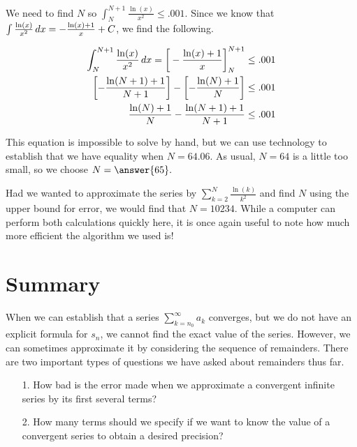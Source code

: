 \documentclass{ximera}
\begin{document}
\begin{example}
\begin{example}
\begin{explanation}
We need to find $N$ so $\int_{N}^{N+1} \frac{\ln(x)}{x^2} \leq .001$.  Since we know that $\int  \frac{\ln(x)}{x^2} \mathop{}\!d x = -\frac{\ln(x)+1}{x} +C$, we find the following.

\begin{align*}
\int_N^{N+1} \frac{\ln(x)}{x^2} \mathop{}\!d x =\bigg[ -\frac{\ln(x)+1}{x} \bigg]_N^{N+1} &\leq .001\\
\left[-\frac{\ln(N+1)+1}{N+1}\right] -\left[-\frac{\ln(N)+1}{N}\right] & \leq .001\\
\frac{\ln(N)+1}{N} -\frac{\ln(N+1)+1}{N+1} & \leq .001\\
\end{align*}

This equation is impossible to solve by hand, but we can use technology to establish that we have equality when $N=64.06$.  As usual, $N=64$ is a little too small, so we choose $N = \answer{65}.$

\begin{remark}
Had we wanted to approximate the series by $\sum_{k=2}^N \frac{\ln(k)}{k^2}$ and find $N$ using the upper bound for error, we would find that $N=10234$.  While a computer can perform both calculations quickly here, it is once again useful to note how much more efficient the algorithm we used is!
\end{remark}

\end{explanation}
\end{example}
\end{example}


\section{Summary}

When we can establish that a series $\sum_{k=n_0}^{\infty} a_k$ converges, but we do not have an explicit formula for $s_n$, we cannot find the exact value of the series.  However, we can sometimes approximate it by considering the sequence of remainders.  There are two important types of questions we have asked about remainders thus far.

\begin{itemize}
\item[1.] How bad is the error made when we approximate a convergent infinite series by its first several terms?
\item[2.] How many terms should we specify if we want to know the value of a convergent series to obtain a desired precision?
\end{itemize}
\end{document}
